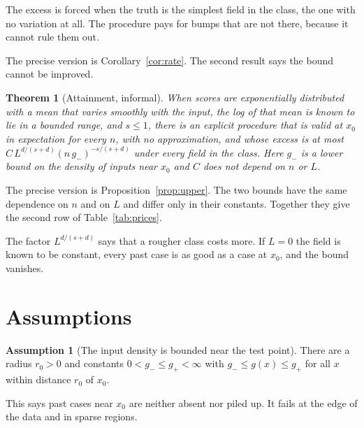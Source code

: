 \documentclass[11pt]{article}
\newtheorem{theorem}{Theorem}
\theoremstyle{definition}
\newtheorem{assumption}{Assumption}
\theoremstyle{remark}
\begin{document}
The excess is forced when the truth is the simplest field in the class, the one with no
variation at all. The procedure pays for bumps that are not there, because it cannot rule
them out.

The precise version is Corollary~\ref{cor:rate}. The second result says the bound cannot be
improved.

\begin{theorem}[Attainment, informal]
When scores are exponentially distributed with a mean that varies smoothly with the input,
the log of that mean is known to lie in a bounded range, and $s\le1$, there is an explicit
procedure that is valid at $x_0$ in expectation for every
$n$, with no approximation, and whose excess is at most
$C\,L^{d/(s+d)}(n\,g_-)^{-s/(s+d)}$ under every field in the class. Here $g_-$ is a lower
bound on the density of inputs near $x_0$ and $C$ does not depend on $n$ or $L$.
\end{theorem}

The precise version is Proposition~\ref{prop:upper}. The two bounds have the same
dependence on $n$ and on $L$ and differ only in their constants. Together they give the
second row of Table~\ref{tab:prices}.

The factor $L^{d/(s+d)}$ says that a rougher class costs more. If $L=0$ the field is known
to be constant, every past case is as good as a case at $x_0$, and the bound vanishes.

\section{Assumptions}\label{sec:assump}

\begin{assumption}[The input density is bounded near the test point]\label{as:design}
There are a radius $r_0>0$ and constants $0<g_-\le g_+<\infty$ with $g_-\le g(x)\le g_+$
for all $x$ within distance $r_0$ of $x_0$.
\end{assumption}

This says past cases near $x_0$ are neither absent nor piled up. It fails at the edge of
the data and in sparse regions.
\end{document}
